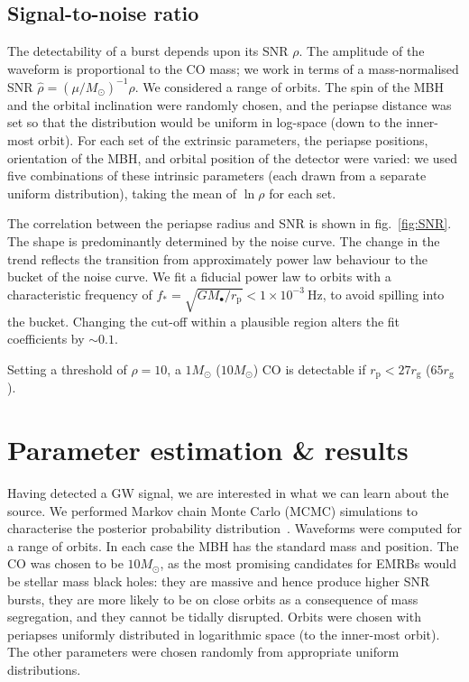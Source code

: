 \documentclass[11pt,twoside]{article}
\begin{document}
\subsection{Signal-to-noise ratio}

The detectability of a burst depends upon its SNR $\rho$. The amplitude of the waveform is proportional to the CO mass; we work in terms of a mass-normalised SNR $\hat{\rho} = (\mu/M_\odot)^{-1}\rho$. We considered a range of orbits. The spin of the MBH and the orbital inclination were randomly chosen, and the periapse distance was set so that the distribution would be uniform in log-space (down to the inner-most orbit). For each set of the extrinsic parameters, the periapse positions, orientation of the MBH, and orbital position of the detector were varied: we used five combinations of these intrinsic parameters (each drawn from a separate uniform distribution), taking the mean of $\ln \rho$ for each set.

The correlation between the periapse radius and SNR is shown in fig.~\ref{fig:SNR}.
The shape is predominantly determined by the noise curve. The change in the trend reflects the transition from approximately power law behaviour to the bucket of the noise curve. We fit a fiducial power law to orbits with a characteristic frequency of $f_\ast = \sqrt{GM_\bullet/r_\mathrm{p}} < 1 \times 10^{-3}~\mathrm{Hz}$, to avoid spilling into the bucket. Changing the cut-off within a plausible region alters the fit coefficients by $\sim 0.1$.

Setting a threshold of $\rho = 10$, a $1 M_\odot$ ($10 M_\odot$) CO is detectable if $r_\mathrm{p} < 27 r_\mathrm{g}$ ($65 r_\mathrm{g}$).

\section{Parameter estimation \& results}\label{sec:Estimation}

Having detected a GW signal, we are interested in what we can learn about the source. We performed Markov chain Monte Carlo (MCMC) simulations to characterise the posterior probability distribution~\citep[chapter 29]{MacKay2003}. Waveforms were computed for a range of orbits. In each case the MBH has the standard mass and position. The CO was chosen to be $10 M_\odot$, as the most promising candidates for EMRBs would be stellar mass black holes: they are massive and hence produce higher SNR bursts, they are more likely to be on close orbits as a consequence of mass segregation, and they cannot be tidally disrupted. Orbits were chosen with periapses uniformly distributed in logarithmic space (to the inner-most orbit). The other parameters were chosen randomly from appropriate uniform distributions. 
\end{document}
